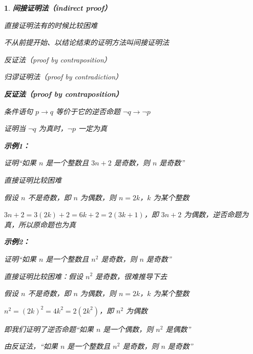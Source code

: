 \documentclass[UTF8]{report}
\theoremstyle{MyLineTheoremStyle} %
\theoremstyle{MyBlockTheoremStyle} %
\theoremstyle{MySubsubsectionStyle} %
\newtheorem{definition}{}
\begin{document}
\begin{definition}
    \textbf{间接证明法（indirect proof）}\par
    直接证明法有的时候比较困难\par
    不从前提开始、以结论结束的证明方法叫间接证明法\par
    \vspace{1em} %
    反证法（proof by contraposition）\par
    归谬证明法（proof by contradiction）\par
\vspace{1em} %
    \textbf{反证法（proof by contraposition）}\par
    条件语句 $p \rightarrow q$ 等价于它的逆否命题 $\neg q \rightarrow \neg p$\par
    证明当 $\neg q$ 为真时，$\neg p$ 一定为真\par
\vspace{1em} %
    \textbf{示例1：}\par
    证明“如果 $n$ 是一个整数且 $3n + 2$ 是奇数，则 $n$ 是奇数”\par
    直接证明比较困难\par
    假设 $n$ 不是奇数，即 $n$ 为偶数，则 $n = 2k$，$k$ 为某个整数\par
    $3n + 2 = 3(2k) + 2 = 6k + 2 = 2(3k + 1)$，即 $3n + 2$ 为偶数，逆否命题为真，所以原命题也为真\par
\vspace{1em} %
    \textbf{示例2：}\par
    证明“如果 $n$ 是一个整数且 $n^2$ 是奇数，则 $n$ 是奇数”\par
    直接证明比较困难：假设 $n^2$ 是奇数，很难推导下去\par
    假设 $n$ 不是奇数，即 $n$ 为偶数，则 $n = 2k$，$k$ 为某个整数\par
    $n^2 = (2k)^2 = 4k^2 = 2(2k^2)$，即 $n^2$ 为偶数\par
    即我们证明了逆否命题“如果 $n$ 是一个偶数，则 $n^2$ 是偶数”\par
    由反证法，“如果 $n$ 是一个整数且 $n^2$ 是奇数，则 $n$ 是奇数”\par
\end{definition}
\end{document}
